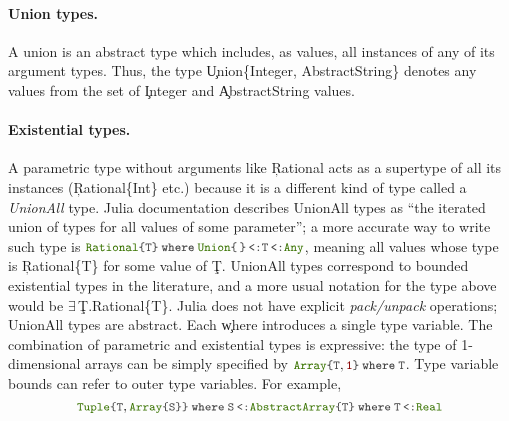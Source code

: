 \paragraph{Union types.}
A union is an abstract type which includes, as values, all instances of any
of its argument types. Thus, the type \c{Union\{Integer, AbstractString\}}
denotes any values from the set of \c{Integer} and \c{AbstractString}
values.

\paragraph{Existential types.} A parametric type without arguments like \c{Rational}
acts as a supertype of all its instances (\c{Rational\{Int\}} etc.)
because it is a different kind of type called a \emph{UnionAll} type.  Julia
documentation describes UnionAll types as ``the iterated union of types for
all values of some parameter''; a more accurate way to write such type is
\(  \texttt{\small\color{jlbuiltin} Rational}   \texttt{\small\color{jlkeyword} \{}  \texttt{\small\color{jlbase}T}  \texttt{\small\color{jlkeyword} \}\kern0pt} \:  \texttt{\small\color{jlbase}\textbf{where}\kern0pt} \:  \texttt{\small\color{jlbuiltin} Union}\! \, \texttt{\small\color{jlkeyword} \{}  \,  \texttt{\small\color{jlkeyword} \}\kern0pt} \!\! \,\,\, \texttt{\small\color{jlkeyword} <:}\,\, \!\! \texttt{\small\color{jlbase}T} \!\! \,\,\, \texttt{\small\color{jlkeyword} <:}\,\, \!\! \texttt{\small\color{jlbuiltin} Any} \), meaning all values whose type is
\c{Rational\{T\}} for some value of \c{T}.  UnionAll types correspond
to bounded existential types in the literature, and a more usual notation
for the type above would be $\exists$\,\c{T.Rational\{T\}}. Julia does not have explicit
  \emph{pack/unpack} operations; UnionAll types are  abstract.
Each \c{where} introduces a single type variable. The combination of
parametric and existential types is expressive: the type of 1-dimensional
arrays can be simply specified by
%
\(  \texttt{\small\color{jlbuiltin} Array}   \texttt{\small\color{jlkeyword} \{}  \texttt{\small\color{jlbase}T}  \ottsym{,}   \texttt{\small\color{jlstring} 1}   \texttt{\small\color{jlkeyword} \}\kern0pt} \:  \texttt{\small\color{jlbase}\textbf{where}\kern0pt} \:  \texttt{\small\color{jlbase}T} \).  
%
Type variable bounds can refer to outer type variables. For example, 
\[  \texttt{\small\color{jlbuiltin} Tuple}\! \, \texttt{\small\color{jlkeyword} \{}  \texttt{\small\color{jlbase}T}  \ottsym{,}   \texttt{\small\color{jlbuiltin} Array}   \texttt{\small\color{jlkeyword} \{}  \texttt{\small\color{jlbase}S}  \texttt{\small\color{jlkeyword} \}\kern0pt}  \texttt{\small\color{jlkeyword} \}\kern0pt} \:  \texttt{\small\color{jlbase}\textbf{where}\kern0pt} \:  \texttt{\small\color{jlbase}S} \!\! \,\,\, \texttt{\small\color{jlkeyword} <:}\,\, \!\!  \texttt{\small\color{jlbuiltin} AbstractArray}    \texttt{\small\color{jlkeyword} \{}  \texttt{\small\color{jlbase}T}  \texttt{\small\color{jlkeyword} \}\kern0pt} \:  \texttt{\small\color{jlbase}\textbf{where}\kern0pt} \:  \texttt{\small\color{jlbase}T} \!\! \,\,\, \texttt{\small\color{jlkeyword} <:}\,\, \!\!  \texttt{\small\color{jlbuiltin} Real}  \]
